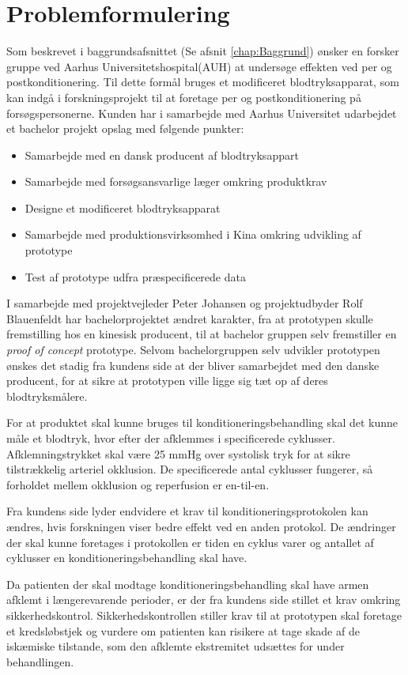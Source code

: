 \chapter{Problemformulering}\label{title:problemformulering}
Som beskrevet i baggrundsafsnittet (Se afsnit \ref{chap:Baggrund}) ønsker en forsker gruppe ved Aarhus Universitetshospital(AUH) at undersøge effekten ved per og postkonditionering. Til dette formål bruges et modificeret blodtryksapparat, som kan indgå i forskningsprojekt til at foretage per og postkonditionering på forsøgspersonerne. Kunden har i samarbejde med Aarhus Universitet udarbejdet et bachelor projekt opslag med følgende punkter:
\begin{itemize}
	\item Samarbejde med en dansk producent af blodtryksappart
	\item Samarbejde med forsøgsansvarlige læger omkring produktkrav
	\item Designe et modificeret blodtryksapparat
	\item Samarbejde med produktionsvirksomhed i Kina omkring udvikling af prototype 
	\item Test af prototype udfra præspecificerede data
\end{itemize}

I samarbejde med projektvejleder Peter Johansen og projektudbyder Rolf Blauenfeldt har bachelorprojektet ændret karakter, fra at prototypen skulle fremstilling hos en kinesisk producent, til at bachelor gruppen selv fremstiller en \textit{proof of concept} prototype. Selvom bachelorgruppen selv udvikler prototypen ønskes det stadig fra kundens side at der bliver samarbejdet med den danske producent, for at sikre at prototypen ville ligge sig tæt op af deres blodtryksmålere.

For at produktet skal kunne bruges til konditioneringsbehandling skal det kunne måle et blodtryk, hvor efter der afklemmes i specificerede cyklusser. Afklemningstrykket skal være 25 mmHg over systolisk tryk for at sikre tilstrækkelig arteriel okklusion. De specificerede antal cyklusser fungerer, så forholdet mellem okklusion og reperfusion er en-til-en. 

Fra kundens side lyder endvidere et krav til konditioneringsprotokolen kan ændres, hvis forskningen viser bedre effekt ved en anden protokol. De ændringer der skal kunne foretages i protokollen er tiden en cyklus varer og antallet af cyklusser en konditioneringsbehandling skal have. 

Da patienten der skal modtage konditioneringsbehandling skal have armen afklemt i længerevarende perioder, er der fra kundens side stillet et krav omkring sikkerhedskontrol. Sikkerhedskontrollen stiller krav til at prototypen skal foretage et kredsløbstjek og vurdere om patienten kan risikere at tage skade af de iskæmiske tilstande, som den afklemte ekstremitet udsættes for under behandlingen.

